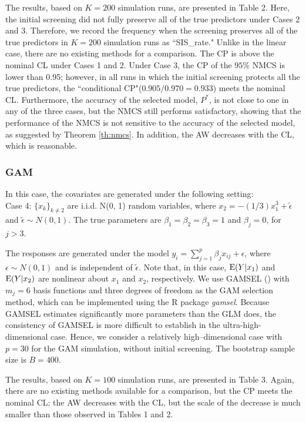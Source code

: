 \documentclass[12pt]{article} %
\theoremstyle{definition}
\begin{document}
The results, based on $K=200$ simulation runs, are presented in Table 2. Here, the initial screening did not fully preserve all of the true predictors under Cases 2 and 3. Therefore, we record the frequency when the screening preserves all of the true predictors in $K= 200$ simulation runs as ``SIS\_rate."  Unlike in the linear case, there are no existing methods for a comparison. The CP is above the nominal CL under Cases 1 and 2. Under Case 3, the CP of the $95\%$ NMCS is lower than 0.95; however, in all runs in which the initial screening protects all the true predictors, the ``conditional CP"($0.905/0.970=0.933$) meets the nominal CL. Furthermore, the accuracy of the selected model, $P^*$, is not close to one in any of the three cases, but the NMCS still performs satisfactory, showing that the performance of the NMCS is not sensitive to the accuracy of the selected model, as suggested by Theorem \ref{th:nmcs}. 
In addition, the AW decreases with the CL, which is reasonable.


\subsubsection{GAM}

In this case, the covariates are generated under the following setting:\\
Case 4: $\{x_k\}_{k\neq 2}$ are i.i.d. N(0, 1) random variables, where $x_2=-(1/3)x_1^3+\tilde{\epsilon}$ and $\tilde{\epsilon} \sim N(0,1)$. The true parameters are $\beta_1=\beta_2=\beta_3=1$ and $\beta_{j}=0$, for $j>3$.

The responses are generated under the model $y_i=\sum_{j=1}^p \beta_j x_{ij}+\epsilon$, where $\epsilon \sim N(0,1)$ and is independent of $\tilde{\epsilon}$. Note that, in this case, ${\rm E}(Y|x_1)$ and ${\rm E}(Y|x_2)$ are nonlinear about $x_1$ and $x_2$, respectively. We use GAMSEL (\citet{Chouldechova2015}) with $m_j=6$ basis functions and three degrees of freedom as the GAM selection method, which can be implemented using the R package \textit{gamsel}. Because GAMSEL estimates significantly more parameters than the GLM does, the consistency of GAMSEL is more difficult to establish in the ultra-high-dimensional case. Hence, we consider a relatively high–dimensional case with $p=30$ for the GAM simulation, without initial screening. The bootstrap sample size is $B=400$.

The results, based on $K=100$ simulation runs, are presented in Table 3. Again, there are no existing methods available for a comparison, but the CP meets the nominal CL; the AW decreases with the CL, but the scale of the decrease is much smaller than those observed in Tables 1 and 2. 
\end{document}
